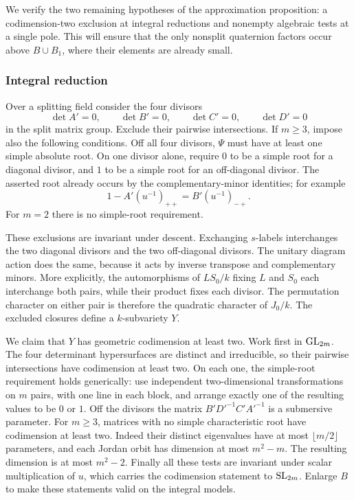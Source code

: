 We verify the two remaining hypotheses of the approximation
proposition: a codimension-two exclusion at integral reductions and
nonempty algebraic tests at a single pole.  This will ensure that the
only nonsplit quaternion factors occur above $B\cup B_1$, where their
elements are already small.

\subsubsection{Integral reduction}

Over a splitting field consider the four divisors
\[
          \det A'=0,\qquad\det B'=0,\qquad
          \det C'=0,\qquad\det D'=0
\]
in the split matrix group.  Exclude their pairwise intersections.  If
$m\geq3$, impose also the following conditions.  Off all four divisors,
$\Psi$ must have at least one simple absolute root.  On one divisor
alone, require $0$ to be a simple root for a diagonal divisor, and $1$
to be a simple root for an off-diagonal divisor.  The asserted root
already occurs by the complementary-minor identities; for example
\[
 1-A'(u^{-1})_{++}=B'(u^{-1})_{-+}.
\]
For $m=2$ there is no simple-root requirement.

These exclusions are invariant under descent.  Exchanging $s$-labels
interchanges the two diagonal divisors and the two off-diagonal
divisors.  The unitary diagram action does the same, because it acts
by inverse transpose and complementary minors.  More explicitly,
the automorphisms of $LS_0/k$ fixing $L$ and $S_0$ each interchange
both pairs, while their product fixes each divisor.  The permutation
character on either pair is therefore the quadratic character of
$J_0/k$.  The excluded closures define a $k$-subvariety $Y$.

We claim that $Y$ has geometric codimension at least two.  Work first
in $\operatorname{GL}_{2m}$.  The four determinant hypersurfaces are distinct and
irreducible, so their pairwise intersections have codimension at least
two.  On each one, the simple-root requirement holds generically: use
independent two-dimensional transformations on $m$ pairs, with one
line in each block, and arrange exactly one of the resulting values
to be $0$ or $1$.  Off the divisors the matrix
$B'D'^{-1}C'A'^{-1}$ is a submersive parameter.  For $m\geq3$, matrices
with no simple characteristic root have codimension at least two.
Indeed their distinct eigenvalues have at most $\lfloor m/2\rfloor$
parameters, and each Jordan orbit has dimension at most $m^2-m$.
The resulting dimension is at most $m^2-2$.  Finally all these tests
are invariant under scalar multiplication of $u$, which carries the
codimension statement to $\operatorname{SL}_{2m}$.  Enlarge $B$ to make these
statements valid on the integral models.

